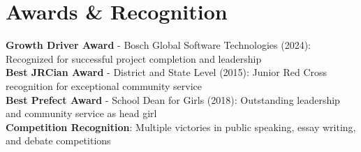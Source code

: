 \documentclass[letterpaper,11pt]{article}
\begin{document}
\section{Awards \& Recognition}
    \begin{itemize}[leftmargin=0.15in, label={}]
        \small{\item{
            \textbf{Growth Driver Award} - Bosch Global Software Technologies (2024): Recognized for successful project completion and leadership \\
            \textbf{Best JRCian Award} - District and State Level (2015): Junior Red Cross recognition for exceptional community service \\
            \textbf{Best Prefect Award} - School Dean for Girls (2018): Outstanding leadership and community service as head girl \\
            \textbf{Competition Recognition}: Multiple victories in public speaking, essay writing, and debate competitions
        }}
    \end{itemize}

\end{document}
